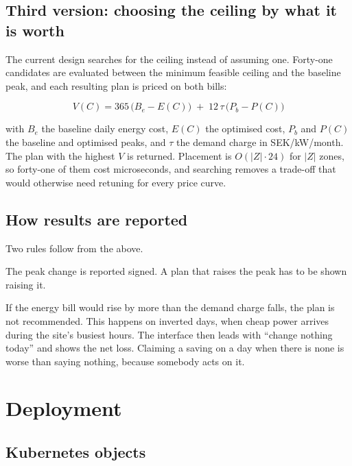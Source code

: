 \documentclass[conference]{IEEEtran}
\begin{document}
\subsection{Third version: choosing the ceiling by what it is worth}

The current design searches for the ceiling instead of assuming one. Forty-one
candidates are evaluated between the minimum feasible ceiling and the baseline
peak, and each resulting plan is priced on both bills:

\begin{equation}
V(C) = 365\,\big(B_e - E(C)\big) \;+\; 12\,\tau\,\big(P_b - P(C)\big)
\label{eq:value}
\end{equation}

with $B_e$ the baseline daily energy cost, $E(C)$ the optimised cost, $P_b$ and
$P(C)$ the baseline and optimised peaks, and $\tau$ the demand charge in
SEK/kW/month. The plan with the highest $V$ is returned. Placement is
$O(|Z|\cdot 24)$ for $|Z|$ zones, so forty-one of them cost microseconds, and
searching removes a trade-off that would otherwise need retuning for every price
curve.

\subsection{How results are reported}

Two rules follow from the above.

The peak change is reported signed. A plan that raises the peak has to be shown
raising it.

If the energy bill would rise by more than the demand charge falls, the plan is
not recommended. This happens on inverted days, when cheap power arrives during
the site's busiest hours. The interface then leads with ``change nothing today''
and shows the net loss. Claiming a saving on a day when there is none is worse
than saying nothing, because somebody acts on it.

\section{Deployment}
\label{sec:deploy}

\subsection{Kubernetes objects}
\end{document}
